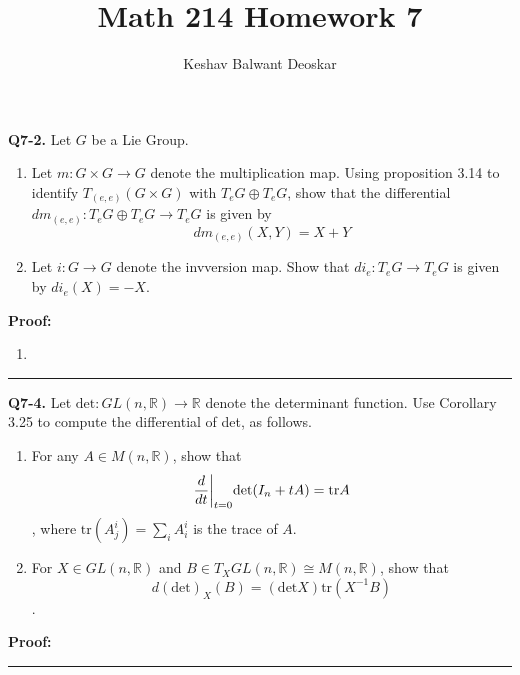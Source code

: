 \documentclass{article}
\title{Math 214 Homework 7}
\author{Keshav Balwant Deoskar}
\newcommand{\R}{\mathbb{R}}
\newcommand{\restr}[2]{{%
  \left.\kern-\nulldelimiterspace %
  #1 %
  \vphantom{\big|} %
  \right|_{#2} %
  }}
\begin{document}
\maketitle


\textbf{Q7-2.} Let $G$ be a Lie Group.
\begin{enumerate}[label=(\alph*)]
  \item Let $m : G \times G \rightarrow G$ denote the multiplication map. Using proposition 3.14 to identify $T_{(e,e)} \left(G \times G\right)$ with $T_{e}G \oplus T_e G$, show that the differential $dm_{(e,e)} : T_e G \oplus T_e G \rightarrow T_e G$ is given by 
  \[ dm_{(e,e)}\left(X, Y\right) = X + Y \]

  \item Let $i : G \rightarrow G$ denote the invversion map. Show that $di_e : T_e G \rightarrow T_e G$ is given by $di_e(X) = -X $.
\end{enumerate}

\vskip 0.5cm
\textbf{Proof:}

\begin{enumerate}[label=(\alph*)]
  \item 
\end{enumerate}

\vskip 0.5cm
\hrule 
\vskip 0.5cm


\textbf{Q7-4.} Let $\mathrm{det} : GL(n, \R) \rightarrow \R$ denote the determinant function. Use Corollary 3.25 to compute the differential of det, as follows.
\begin{enumerate}[label=(\alph*)]
  \item For any $A \in M(n, \R)$, show that 
  \[ \restr{\frac{d}{dt}}{t = 0} \mathrm{det}(I_n + tA) = \mathrm{tr}A \], where $\mathrm{tr}\left(A^i_j\right) = \sum_{i} A^i_i$ is the trace of $A$.
  
  \item For $X \in GL(n, \R)$ and $B \in T_X GL(n, \R) \cong M(n,\R)$, show that 
  \[ d\left(\mathrm{det}\right)_X (B) = \left( \mathrm{det} X \right) \mathrm{tr} \left(X^{-1} B\right) \].
\end{enumerate}

\vskip 0.5cm
\textbf{Proof:}


\vskip 0.5cm
\hrule 
\vskip 0.5cm
\end{document}
